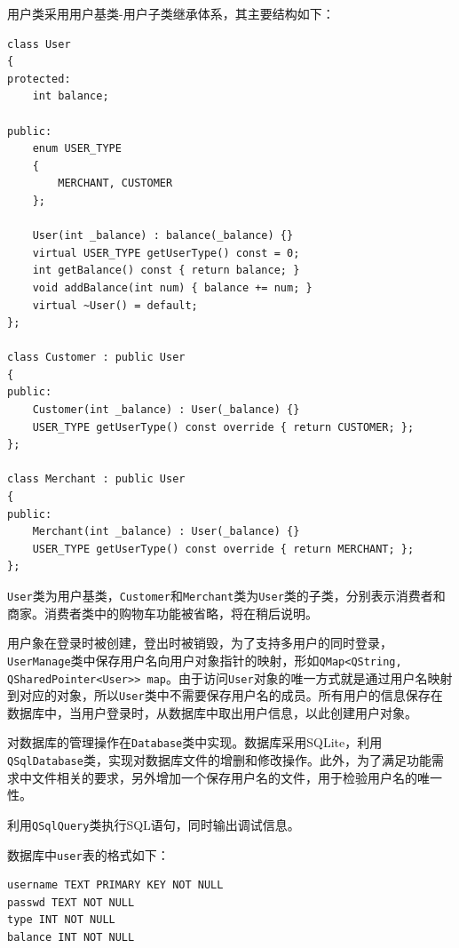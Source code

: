 \documentclass[lang=cn,11pt,a4paper,cite=authornum]{paper}
\begin{document}
用户类采用用户基类-用户子类继承体系，其主要结构如下：

\begin{code}
\begin{verbatim}
class User
{
protected:
    int balance; 
 
public:
    enum USER_TYPE
    {
        MERCHANT, CUSTOMER
    };

    User(int _balance) : balance(_balance) {}
    virtual USER_TYPE getUserType() const = 0;
    int getBalance() const { return balance; }
    void addBalance(int num) { balance += num; }
    virtual ~User() = default;
};
 
class Customer : public User
{
public:
    Customer(int _balance) : User(_balance) {}
    USER_TYPE getUserType() const override { return CUSTOMER; };
};
 
class Merchant : public User
{
public:
    Merchant(int _balance) : User(_balance) {}
    USER_TYPE getUserType() const override { return MERCHANT; };
};
\end{verbatim}
\end{code}

\texttt{User}类为用户基类，\texttt{Customer}和\texttt{Merchant}类为\texttt{User}类的子类，分别表示消费者和商家。消费者类中的购物车功能被省略，将在稍后说明。

用户象在登录时被创建，登出时被销毁，为了支持多用户的同时登录，\texttt{UserManage}类中保存用户名向用户对象指针的映射，形如\texttt{QMap<QString, QSharedPointer<User>> map}。由于访问\texttt{User}对象的唯一方式就是通过用户名映射到对应的对象，所以\texttt{User}类中不需要保存用户名的成员。所有用户的信息保存在数据库中，当用户登录时，从数据库中取出用户信息，以此创建用户对象。

对数据库的管理操作在\texttt{Database}类中实现。数据库采用SQLite，利用\texttt{QSqlDatabase}类，实现对数据库文件的增删和修改操作。此外，为了满足功能需求中文件相关的要求，另外增加一个保存用户名的文件，用于检验用户名的唯一性。

利用\texttt{QSqlQuery}类执行SQL语句，同时输出调试信息。

数据库中\texttt{user}表的格式如下：

\begin{code}
\begin{verbatim}
username TEXT PRIMARY KEY NOT NULL
passwd TEXT NOT NULL
type INT NOT NULL
balance INT NOT NULL
\end{verbatim}
\end{code}
\end{document}
